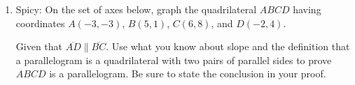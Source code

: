 \documentclass[12pt, twoside]{article}
\begin{document}
\begin{enumerate}
  \newpage

  \item Spicy: On the set of axes below, graph the quadrilateral $ABCD$ having coordinates $A(-3,-3)$, $B(5,1)$, $C(6,8)$, and $D(-2,4)$.
    \begin{center} %
    \end{center}
    Given that $\overline{AD} \parallel \overline{BC}$. Use what you know about slope and the definition that a parallelogram is a quadrilateral with two pairs of parallel sides to prove $ABCD$ is a parallelogram. Be sure to state the conclusion in your proof.



  \end{enumerate}

  
\end{document}
